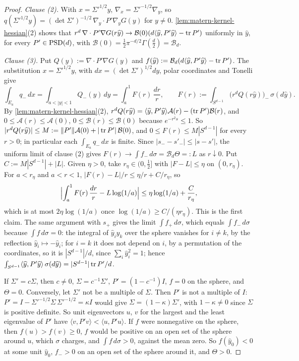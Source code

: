 \begin{proof}
\emph{Clause (2).} With $x = \Sigma'^{1/2}y$, $\nabla_x = \Sigma'^{-1/2}\nabla_y$, so
$q(\Sigma'^{1/2}y) = (\det\Sigma')^{-1/2}\,\nabla_y\cdot P'\nabla_yG(y)$ for $y \ne 0$.
\ref{lem:matern-kernel-hessian}(2) shows that
$r^d\,\nabla\cdot P'\nabla G(r\widehat y) \to
\mathcal{B}(0)(d\langle\widehat y,P'\widehat y\rangle - \operatorname{tr} P')$ uniformly in $\widehat y$, for
every $P' \in \mathrm{PSD}(d)$, with $\mathcal{B}(0) = \tfrac12\pi^{-d/2}\Gamma(\tfrac d2) = \mathcal{B}_d$.

\emph{Clause (3).} Put $Q(y) := \nabla\cdot P'\nabla G(y)$ and
$f(\widehat y) := \mathcal{B}_d(d\langle\widehat y,P'\widehat y\rangle - \operatorname{tr} P')$. The substitution
$x = \Sigma'^{1/2}y$, with $dx = (\det\Sigma')^{1/2}dy$, polar coordinates and Tonelli give
\[
  \int_{E_a}q_-\,dx = \int_{a<|y|<1}Q_-(y)\,dy = \int_a^1F(r)\,\frac{dr}{r} , \qquad
  F(r) := \int_{S^{d-1}}\bigl(r^dQ(r\widehat y)\bigr)_-\,\sigma(d\widehat y) .
\]
By \ref{lem:matern-kernel-hessian}(2), $r^dQ(r\widehat y) = \langle\widehat y,P'\widehat y\rangle\mathcal{A}(r) - (\operatorname{tr} P')\mathcal{B}(r)$,
and $0 \le \mathcal{A}(r) \le \mathcal{A}(0)$, $0 \le \mathcal{B}(r) \le \mathcal{B}(0)$ because
$e^{-r^2s} \le 1$. So $|r^dQ(r\widehat y)| \le M := \|P'\|\mathcal{A}(0) + |\operatorname{tr} P'|\,\mathcal{B}(0)$, and
$0 \le F(r) \le M|S^{d-1}|$ for every $r > 0$; in particular each $\int_{E_a}q_-\,dx$ is finite.
Since $|s_- - s'_-| \le |s - s'|$, the uniform limit of clause (2) gives
$F(r) \to \int f_-\,d\sigma = \mathcal{B}_d\Theta =: L$ as $r \downarrow 0$. Put
$C := M|S^{d-1}| + |L|$. Given $\eta > 0$, take $r_\eta \in (0,\tfrac12]$ with $|F - L| \le \eta$
on $(0,r_\eta)$. For $a < r_\eta$ and $a < r < 1$, $|F(r) - L|/r \le \eta/r + C/r_\eta$, so
\[
  \Bigl|\int_a^1F(r)\,\frac{dr}{r} - L\log(1/a)\Bigr| \le \eta\log(1/a) + \frac{C}{r_\eta} ,
\]
which is at most $2\eta\log(1/a)$ once $\log(1/a) \ge C/(\eta r_\eta)$. This is the first claim.
The same argument with $s_+$ gives the limit $\int f_+\,d\sigma$, which equals $\int f_-\,d\sigma$
because $\int f\,d\sigma = 0$: the integral of $\widehat y_i\widehat y_k$ over the sphere vanishes for
$i \ne k$, by the reflection $\widehat y_i \mapsto -\widehat y_i$; for $i = k$ it does not depend on
$i$, by a permutation of the coordinates, so it is $|S^{d-1}|/d$, since
$\sum_i\widehat y_i^2 = 1$; hence
$\int_{S^{d-1}}\langle\widehat y,P'\widehat y\rangle\,\sigma(d\widehat y) = |S^{d-1}|\operatorname{tr} P'/d$.

If $\Sigma' = c\Sigma$, then $c \ne 0$, $\Sigma = c^{-1}\Sigma'$, $P' = (1 - c^{-1})I$, $f = 0$ on the
sphere, and $\Theta = 0$. Conversely, let $\Sigma'$ not be a multiple of $\Sigma$. Then $P'$ is not
a multiple of $I$: $P' = I - \Sigma'^{-1/2}\Sigma\,\Sigma'^{-1/2} = \kappa I$ would give
$\Sigma = (1 - \kappa)\Sigma'$, with $1 - \kappa \ne 0$ since $\Sigma$ is positive definite. So unit
eigenvectors $u$, $v$ for the largest and the least eigenvalue of $P'$ have
$\langle v,P'v\rangle < \langle u,P'u\rangle$. If $f$ were nonnegative on the sphere, then
$f(u) > f(v) \ge 0$, $f$ would be positive on an open set of the sphere around $u$, which $\sigma$
charges, and $\int f\,d\sigma > 0$, against the mean zero. So $f(\widehat y_0) < 0$ at some unit
$\widehat y_0$, $f_- > 0$ on an open set of the sphere around it, and $\Theta > 0$.


\end{proof}
